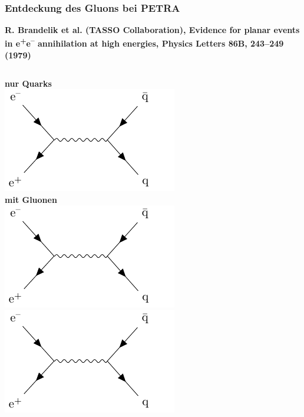 \documentclass[10pt,t]{beamer}
\begin{document}
\begin{frame}
\frametitle{Entdeckung des Gluons bei PETRA}
\vspace*{-2.6\baselineskip}
\alert{\bfseries\footnotesize R. Brandelik et al. (TASSO Collaboration), Evidence for planar events in e\textsuperscript{+}e\textsuperscript{--} annihilation at high energies, Physics Letters 86B, 243--249 (1979)}
\vspace*{\baselineskip}
\begin{columns}
    \textbf{nur Quarks} \\
    \includegraphics[width=\textwidth,page=1]{gluon-feynman} \\[1ex]
    \textbf{mit Gluonen} \\
    \includegraphics[width=\textwidth,page=2]{gluon-feynman} \\
    \includegraphics[width=\textwidth,page=3]{gluon-feynman} \\

\end{columns}
\end{frame}
\end{document}
